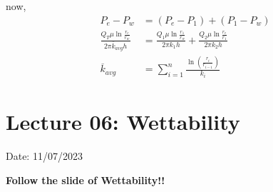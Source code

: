 \documentclass{article}
\begin{document}
now,
\begin{align*}
    P_e - P_w &= (P_e-P_1)+(P_1-P_w) \\ 
    \frac{Q_T \mu \ln \frac{r_e}{r_w}}{2\pi \overline{k}_{avg} h} &= \frac{Q_1 \mu \ln \frac{r_1}{r_w}}{2\pi k_1 h} + \frac{Q_2 \mu \ln \frac{r_e}{r_1}}{2\pi k_2 h} \\
    \overline{k}_{avg} &= \sum_{i=1}^{n} \frac{\ln \left(\frac{r_i}{r_{i-1}}\right)}{k_i}
\end{align*}

\section{Lecture 06: Wettability} 
\hfill Date: 11/07/2023

\textbf{Follow the slide of Wettability!!}
\vspace*{1cm}
\end{document}

